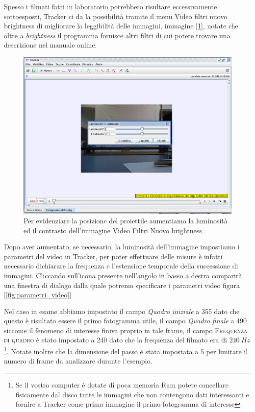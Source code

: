 \documentclass[a4paper,10pt,oneside]{article}
\begin{document}
Spesso i filmati fatti in laboratorio potrebbero risultare eccessivamente sottoesposti, Tracker ci da la possibilità tramite il menu Video \RIGHTarrow filtri \RIGHTarrow nuovo \RIGHTarrow brightness
di migliorare la leggibilità delle immagini, immagine [\ref{fig:filtro_luminosita}],  notate che oltre a \emph{brightness} il programma fornisce altri filtri di cui potete trovare una descrizione nel manuale  online.

\begin{figure}[H]
 \centering
 \includegraphics[width=\textwidth]{./immagini/tracker_filtri_luminosita.png}
 \caption{Per evidenziare la posizione del proiettile aumentiamo la luminosità ed il contrasto dell'immagine  Video \RIGHTarrow Filtri  \RIGHTarrow  Nuovo \RIGHTarrow brightness}
 \label{fig:filtro_luminosita}
\end{figure}
Dopo aver aumentato, se necessario, la luminosità dell'immagine impostiamo i parametri del video in Tracker, per poter effettuare delle misure è infatti necessario dichiarare la frequenza e l'estensione temporale della successione di immagini. Cliccando sull'icona presente nell'angolo in basso a destra comparirà una finestra di dialogo dalla quale potremo specificare i parametri video figura [\ref{fig:parametri_video}]



Nel caso in esame abbiamo impostato il campo \textsl{Quadro iniziale} a 355 dato che questo è risultato essere il primo fotogramma utile, il campo \textsl{Quadro finale} a 490 siccome il fenomeno di interesse finiva proprio in tale frame, il campo \textsc{Frequenza di quadro} è stato impostato a 240 dato che la frequenza del filmato era di $240\ Hz$ \footnote{Se il vostro computer è dotate di poca memoria Ram potete cancellare fisicamente dal disco tutte le immagini che non contengono dati interessanti e fornire a Tracker come prima immagine il primo fotogramma di interesse}. Notate inoltre che la dimensione del passo è stata impostata a 5 per limitare il numero di frame da analizzare durante
l'esempio.
\end{document}
